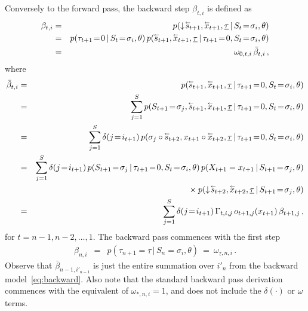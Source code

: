 \documentclass[a4paper]{article}
\newcommand{\rvec}[1]{\accentset{\leftarrow}{#1}}
\newcommand{\dn}{\downarrow\!}
\newcommand{\ut}{\underline{\tau}}
\begin{document}
Conversely to the forward pass, the backward step $\beta_{t,i}$ is defined as
\begin{eqnarray}
   \beta_{t,i} & = & p(\dn\rvec{s}_{t+1},\rvec{x}_{t+1},\ut\,|\,S_t\!=\!\sigma_{i},\theta) 
\nonumber\\& = &
  p(\tau_{t+1}\!=\!0\,|\,S_t\!=\!\sigma_i,\theta)\,p(\rvec{s}_{t+1},\rvec{x}_{t+1},\ut\,|\,\tau_{t+1}\!=\!0,S_t\!=\!\sigma_{i},\theta) 
\nonumber\\& = &
  \omega_{0,t,i}\,\bar{\beta}_{t,i}\,,
\label{eq:beta}
\end{eqnarray}
where
\begin{eqnarray}
   \bar{\beta}_{t,i} & = & p(\rvec{s}_{t+1},\rvec{x}_{t+1},\ut\,|\,\tau_{t+1}\!=\!0,S_t\!=\!\sigma_{i},\theta) 
\nonumber\\& = &
  \sum_{j=1}^{S} p(S_{t+1}\!=\!\sigma_j,\rvec{s}_{t+1},\rvec{x}_{t+1},\ut\,|\,\tau_{t+1}\!=\!0,S_t\!=\!\sigma_{i},\theta) 
\nonumber\\& = &
  \sum_{j=1}^{S}\delta(j\!=\!i_{t+1})\, p(\sigma_j\circ\rvec{s}_{t+2},x_{t+1}\circ\rvec{x}_{t+2},\ut\,|\,\tau_{t+1}\!=\!0,S_t\!=\!\sigma_{i},\theta) 
\nonumber\\& = & 
   \sum_{j=1}^{S}\delta(j\!=\!i_{t+1})\, p(S_{t+1}\!=\!\sigma_j\,|\,\tau_{t+1}\!=\!0,S_t\!=\!\sigma_i,\theta)
\,p(X_{t+1}=x_{t+1}\,|\,S_{t+1}\!=\!\sigma_j,\theta)
\nonumber\\&&\hspace*{5mm}{}\times
p(\dn\rvec{s}_{t+2},\rvec{x}_{t+2},\ut\,|\,S_{t+1}\!=\!\sigma_{j},\theta) 
\nonumber\\& = & 
	\sum_{j=1}^{S}\delta(j\!=\!i_{t+1})\,\Gamma_{t,i,j}\,o_{t+1,j}(x_{t+1})\,\beta_{t+1,j}
\,,
\end{eqnarray}
for $t=n-1,n-2,\ldots,1$. The backward pass commences with the first step
\begin{eqnarray}
   \beta_{n,i} & = & p(\tau_{n+1}\!=\!\ut\,|\,S_n\!=\!\sigma_i,\theta)
~=~\omega_{\ut,n,i}\,.
\label{eq:beta_n}
\end{eqnarray}
Observe that $\bar{\beta}_{n-1,i'_{n-1}}$ is just
the entire summation over $i'_n$ from the backward model~\eqref{eq:backward}.
Also note that the standard backward pass derivation commences with the equivalent of $\omega_{*,n,i}=1$,
and does not include the $\delta(\cdot)$ or $\omega$ terms.
\end{document}
